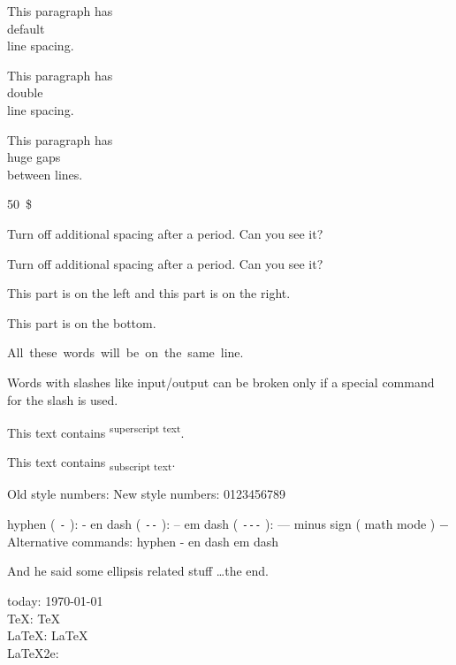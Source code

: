 \documentclass[11pt,a4paper,titlepage,onecolumn]{article}
\begin{document}
This paragraph has \\ default \\ line spacing.
 
\begin{doublespace}
  This paragraph has \\ double \\ line spacing.
\end{doublespace}
 
\begin{spacing}{2.5}
  This paragraph has \\ huge gaps \\ between lines.
\end{spacing}

50~\$

\frenchspacing \par
Turn off additional spacing after a period. Can you see it?

\nonfrenchspacing \par
Turn off additional spacing after a period. Can you see it?

This part is on the left \hfill and this part is on the right.

\vfill
This part is on the bottom.
\newpage

\mbox{All these words will be on the same line.}\\

Words with slashes like input\slash output can be broken only if a special command for the slash is used.

This text contains \textsuperscript{superscript text}.

This text contains \textsubscript{subscript text}.

Old style numbers: 
New style numbers: 0123456789

hyphen ( \verb|-| ): - en dash ( \verb|--| ): -- em dash ( \verb|---| ): --- minus sign ( math mode ) $-$\\
Alternative commands: hyphen \hyp{} en dash \textendash{} em dash \textemdash{}

And he said some ellipsis related stuff \ldots the end.
\newline

today: \today \\
TeX: \TeX \\
LaTeX: \LaTeX \\
LaTeX2e: \LaTeXe \\
\end{document}
